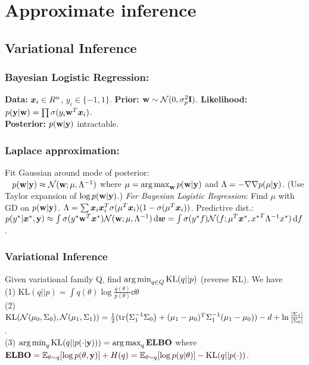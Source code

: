 
\section{Approximate inference}
\subsection{Variational Inference}
\subsubsection*{Bayesian Logistic Regression:}
\textbf{Data:} ${\bm{x}}_i \in R^n$, $y_i\in\{-1,1\}$.
\textbf{Prior:} ${\mathbf{w}}\sim\mathcal{N}(0,\sigma^2_p\mathbf{I})$.
\textbf{Likelihood:} $p({\mathbf{y}}|{\mathbf{w}}) = \prod\sigma(y_i{\mathbf{w}}^T{\bm{x}}_i)$.\\
\textbf{Posterior:} $p({\mathbf{w}}|{\mathbf{y}})$ intractable.
\subsubsection*{Laplace approximation:}
Fit Gaussian around mode of posterior:\\\hphantom\,\,\,\,\,$p({\mathbf{w}}|{\mathbf{y}})\approx\mathcal{N}({\mathbf{w}};\mu,\Lambda^{-1})$ where $\mu = \operatorname*{arg\,max}_{\mathbf{w}}{p({\mathbf{w}}|{\mathbf{y}})}$ and $\Lambda = -\nabla\nabla p(\mu|{\mathbf{y}})$. (Use Taylor expansion of $\log p({\mathbf{w}}|{\mathbf{y}})$.)
\emph{For Bayesian Logistic Regression}: Find $\mu$ with GD on $p({\mathbf{w}}|{\mathbf{y}})$. $\Lambda = \sum {\bm{x}}_i{\bm{x}}_i^T\sigma(\mu^T {\bm{x}}_i)(1-\sigma(\mu^T {\bm{x}}_i))$. Predictive dist.: $p(y^*|{\bm{x}}^*,{\mathbf{y}}) \approx \int\sigma(y^*{\mathbf{w}}^T{\bm{x}}^*)\mathcal{N}({\mathbf{w}};\mu,\Lambda^{-1}) \dd{{\bm{w}}}   = \int\sigma(y^*f)\mathcal{N}(f;\mu^T{\bm{x}}^*, {x^*}^T\Lambda^{-1}x^*) \dd{f}$.
\subsubsection*{Variational Inference}
Given variational family Q, find $\operatorname*{arg\,min}_{q\in Q}\mathrm{KL}(q||p)$ (reverse KL). We have\\
(1) $\mathrm{KL}(q||p) = \int q(\theta)\log\frac{q(\theta)}{p(\theta)}\dd{\theta}$\\ 
(2) $\mathrm{KL}(\mathcal{N}(\mu_0,\Sigma_0),\mathcal{N}(\mu_1,\Sigma_1)) = \frac{1}{2}(\tr(\Sigma_1^{-1}\Sigma_0)+(\mu_1-\mu_0)^T\Sigma_1^{-1}(\mu_1-\mu_0))-d+\ln\frac{|\Sigma_1|}{|\Sigma_0|}$.\\
(3) $\operatorname*{arg\,min}_{q}\mathrm{KL}(q||p(\cdot|{\mathbf{y}}))) = \operatorname*{arg\,max}_q \mathrm{\color{black}\mathbf{ELBO}}$ where $\mathrm{\color{black}\mathbf{ELBO}} = \mathbb{E}_{\theta\sim q}[\log p(\theta, {\mathbf{y}})] + H(q) = \mathbb{E}_{\theta\sim q}[\log p(y|\theta)] - \mathrm{KL}(q||p(\cdot))$.

